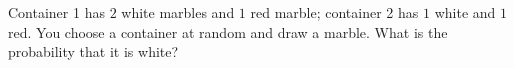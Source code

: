 Container 1 has $2$ white marbles and $1$ red marble; container 2 has $1$ white and $1$ red. You choose a container at random and draw a marble. What is the probability that it is white?

